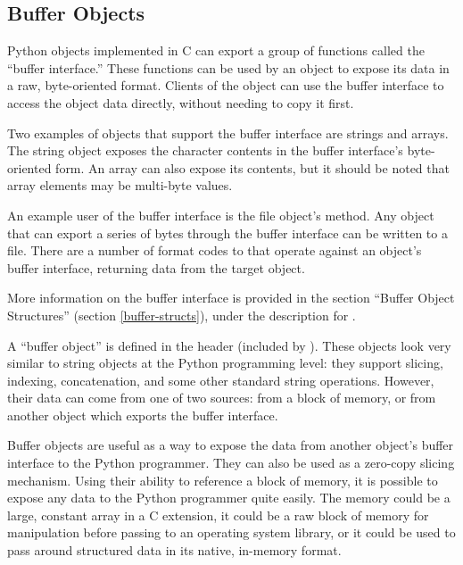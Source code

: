 \documentclass{manual}
\begin{document}
\subsection{Buffer Objects \label{bufferObjects}}

Python objects implemented in C can export a group of functions called
the ``buffer interface.''  These functions can
be used by an object to expose its data in a raw, byte-oriented
format. Clients of the object can use the buffer interface to access
the object data directly, without needing to copy it first.

Two examples of objects that support 
the buffer interface are strings and arrays. The string object exposes 
the character contents in the buffer interface's byte-oriented
form. An array can also expose its contents, but it should be noted
that array elements may be multi-byte values.

An example user of the buffer interface is the file object's
 method. Any object that can export a series of bytes
through the buffer interface can be written to a file. There are a
number of format codes to  that operate 
against an object's buffer interface, returning data from the target
object.

More information on the buffer interface is provided in the section
``Buffer Object Structures'' (section \ref{buffer-structs}), under
the description for .

A ``buffer object'' is defined in the  header
(included by ). These objects look very similar to
string objects at the Python programming level: they support slicing,
indexing, concatenation, and some other standard string
operations. However, their data can come from one of two sources: from
a block of memory, or from another object which exports the buffer
interface.

Buffer objects are useful as a way to expose the data from another
object's buffer interface to the Python programmer. They can also be
used as a zero-copy slicing mechanism. Using their ability to
reference a block of memory, it is possible to expose any data to the
Python programmer quite easily. The memory could be a large, constant
array in a C extension, it could be a raw block of memory for
manipulation before passing to an operating system library, or it
could be used to pass around structured data in its native, in-memory
format.
\end{document}
